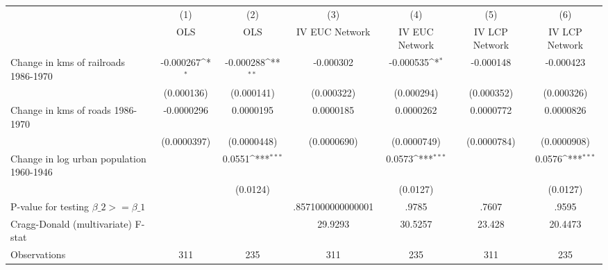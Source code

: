 {
\def\sym#1{\ifmmode^{#1}\else\(^{#1}\)\fi}
\begin{tabular}{l*{6}{c}}
\hline\hline
                &\multicolumn{1}{c}{(1)}&\multicolumn{1}{c}{(2)}&\multicolumn{1}{c}{(3)}&\multicolumn{1}{c}{(4)}&\multicolumn{1}{c}{(5)}&\multicolumn{1}{c}{(6)}\\
                &\multicolumn{1}{c}{OLS}&\multicolumn{1}{c}{OLS}&\multicolumn{1}{c}{IV EUC Network}&\multicolumn{1}{c}{IV EUC Network}&\multicolumn{1}{c}{IV LCP Network}&\multicolumn{1}{c}{IV LCP Network}\\
\hline
Change in kms of railroads 1986-1970&-0.000267\sym{*}  &-0.000288\sym{**} &-0.000302         &-0.000535\sym{*}  &-0.000148         &-0.000423         \\
                &(0.000136)         &(0.000141)         &(0.000322)         &(0.000294)         &(0.000352)         &(0.000326)         \\
[1em]
Change in kms of roads 1986-1970&-0.0000296         &0.0000195         &0.0000185         &0.0000262         &0.0000772         &0.0000826         \\
                &(0.0000397)         &(0.0000448)         &(0.0000690)         &(0.0000749)         &(0.0000784)         &(0.0000908)         \\
[1em]
Change in log urban population 1960-1946&                  &   0.0551\sym{***}&                  &   0.0573\sym{***}&                  &   0.0576\sym{***}\\
                &                  & (0.0124)         &                  & (0.0127)         &                  & (0.0127)         \\
\hline
P-value for testing $\beta\_{2} >= \beta\_{1}$&                  &                  &.8571000000000001         &    .9785         &    .7607         &    .9595         \\
Cragg-Donald (multivariate) F-stat&                  &                  &  29.9293         &  30.5257         &   23.428         &  20.4473         \\
Observations    &      311         &      235         &      311         &      235         &      311         &      235         \\
\hline\hline
\end{tabular}
}
